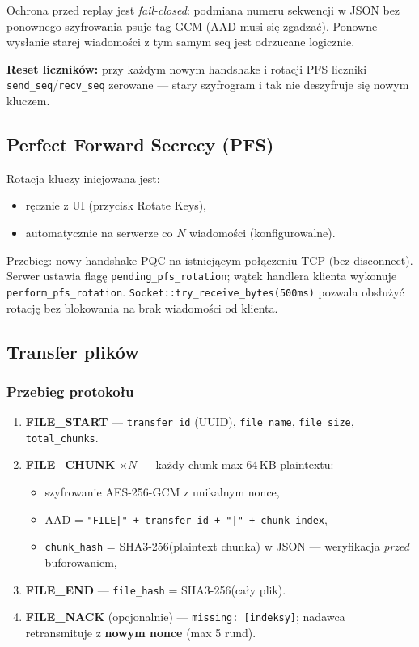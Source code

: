 \documentclass[12pt,a4paper]{article}
\begin{document}
Ochrona przed replay jest \emph{fail-closed}: podmiana numeru sekwencji w JSON bez ponownego szyfrowania psuje tag GCM (AAD musi się zgadzać). Ponowne wysłanie starej wiadomości z tym samym seq jest odrzucane logicznie.

\textbf{Reset liczników:} przy każdym nowym handshake i rotacji PFS liczniki \texttt{send\_seq}/\texttt{recv\_seq} zerowane --- stary szyfrogram i tak nie deszyfruje się nowym kluczem.

\subsection{Perfect Forward Secrecy (PFS)}

Rotacja kluczy inicjowana jest:
\begin{itemize}
    \item ręcznie z UI (przycisk Rotate Keys),
    \item automatycznie na serwerze co $N$ wiadomości (konfigurowalne).
\end{itemize}

Przebieg: nowy handshake PQC na istniejącym połączeniu TCP (bez disconnect). Serwer ustawia flagę \texttt{pending\_pfs\_rotation}; wątek handlera klienta wykonuje \texttt{perform\_pfs\_rotation}. \texttt{Socket::try\_receive\_bytes(500ms)} pozwala obsłużyć rotację bez blokowania na brak wiadomości od klienta.

\subsection{Transfer plików}

\subsubsection{Przebieg protokołu}

\begin{enumerate}
    \item \textbf{FILE\_START} --- \texttt{transfer\_id} (UUID), \texttt{file\_name}, \texttt{file\_size}, \texttt{total\_chunks}.
    \item \textbf{FILE\_CHUNK} $\times N$ --- każdy chunk max 64\,KB plaintextu:
    \begin{itemize}
        \item szyfrowanie AES-256-GCM z unikalnym nonce,
        \item AAD = \texttt{"FILE|" + transfer\_id + "|" + chunk\_index},
        \item \texttt{chunk\_hash} = SHA3-256(plaintext chunka) w JSON --- weryfikacja \emph{przed} buforowaniem,
    \end{itemize}
    \item \textbf{FILE\_END} --- \texttt{file\_hash} = SHA3-256(cały plik).
    \item \textbf{FILE\_NACK} (opcjonalnie) --- \texttt{missing: [indeksy]}; nadawca retransmituje z \textbf{nowym nonce} (max 5 rund).
\end{enumerate}
\end{document}
